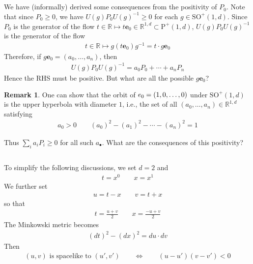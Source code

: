 \documentclass[12pt,b5paper,notitlepage]{article}
\theoremstyle{definition}
\newtheorem{rem}[df]{Remark}
\theoremstyle{plain}
\newcommand{\mbf}{\mathbf}
\newcommand{\blt}{\bullet}
\newcommand{\Rbb}{\mathbb R}
\newcommand{\Poid}{{\mathrm P}^+(1,d)}
\newcommand{\ebf}{\mathbf e}
\newcommand{\SO}{\mathrm{SO}}
\numberwithin{equation}{section}
\begin{document}
\subsection{}\label{lb2}


We have (informally) derived some consequences from the positivity of $P_0$.  Note that since $P_0\geq0$, we have $U(g)P_0U(g)^{-1}\geq0$ for each $g\in\SO^+(1,d)$. Since $P_0$ is the generator of the flow $t\in\Rbb\mapsto t\ebf_0\in\Rbb^{1,d}\subset\Poid$, $U(g)P_0U(g)^{-1}$ is the generator of the flow
\begin{align}
t\in\Rbb\mapsto g(t\ebf_0)g^{-1}=t\cdot g\ebf_0
\end{align}
Therefore, if $g\mbf e_0=(a_0,\dots,a_n)$, then
\begin{align}
U(g)P_0U(g)^{-1}=a_0P_0+\cdots+a_nP_n
\end{align}
Hence the RHS must be positive. But what are all the possible $g\ebf_0$?

\begin{rem}
One can show that the orbit of $\mbf \ebf_0=(1,0,\dots,0)$ under $\mathrm{SO}^+(1,d)$ is the upper hyperbola with diameter $1$, i.e., the set of all $(a_0,\dots,a_n)\in\Rbb^{1,d}$ satisfying
\begin{align}
a_0>0\qquad (a_0)^2-(a_1)^2-\cdots-(a_n)^2=1
\end{align}
\end{rem}

Thus $\sum_i a_iP_i\geq0$ for all such $a_\blt$. What are the consequences of this positivity?



\subsection{}



To simplify the following discussions, we set $d=2$ and
\begin{align*}
t=x^0\qquad x=x^1
\end{align*}
We further set
\begin{align}
u=t-x\qquad v=t+x
\end{align}
so that
\begin{align}
t=\frac{u+v}2\qquad x=\frac{-u+v}2
\end{align}
The Minkowski metric becomes
\begin{align}
\boxed{~(dt)^2-(dx)^2=du\cdot dv~}
\end{align}
Then 
\begin{align}
(u,v)\text{ is spacelike to }(u',v')\qquad\Longleftrightarrow\qquad (u-u')(v-v')<0
\end{align}
\end{document}
